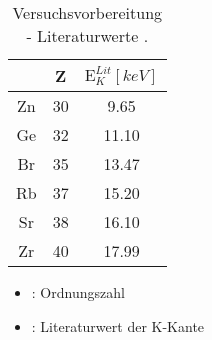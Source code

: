 \begin{table}
    \begin{minipage}{.5\textwidth} 
        \caption{Versuchsvorbereitung - Literaturwerte \cite{Steffen}.}
        \centering
        \begin{tabular}{c c c}
            \toprule
                \mbox{} & Z & $\text{E}_K^{Lit} [\si{keV}]$  \\ %
            \midrule
                Zn & 30 & 9.65   \\
                Ge & 32 & 11.10  \\
                Br & 35 & 13.47  \\
                Rb & 37 & 15.20  \\
                Sr & 38 & 16.10  \\
                Zr & 40 & 17.99 \\
            \bottomrule    
        \end{tabular}
    \end{minipage}
\begin{minipage}{.5\textwidth}
    \begin{itemize}
    \item[]{: Ordnungszahl}
    \item[]{: Literaturwert der K-Kante}
    \end{itemize}
\end{minipage}
\end{table}

